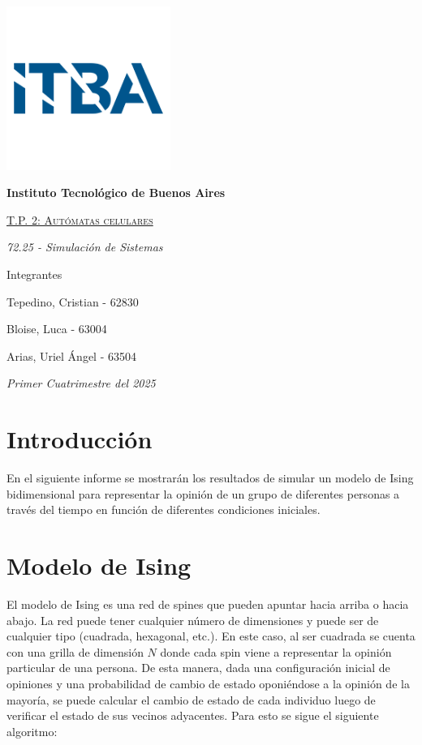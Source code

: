 \documentclass[12pt]{article}
\begin{document}
\begin{titlepage}
\begin{center}

{\includegraphics[width=0.4\textwidth]{itba-1.png}\par}
\vspace{1cm}
{\bfseries\LARGE Instituto Tecnológico de Buenos Aires \par}
\vspace{0.5cm}
{\scshape\Huge\underline {T.P. 2: Autómatas celulares} \par}
\vspace{0.4cm}
{\Large\itshape 72.25 - Simulación de Sistemas  \par}
\end{center}
\vfill

{\Large Integrantes \par}
\centering
{\Large Tepedino, Cristian - 62830 \par}
{\Large Bloise, Luca - 63004 \par}
{\Large Arias, Uriel Ángel - 63504 \par}

\vfill
{\Large\itshape Primer Cuatrimestre del 2025 \par}
\end{titlepage}

\setcounter{page}{0}
\tableofcontents
\clearpage

\section{Introducción}
En el siguiente informe se mostrarán los resultados de simular un modelo de Ising bidimensional para representar la opinión de un grupo de diferentes personas a través del tiempo en función de diferentes condiciones iniciales.

\section{Modelo de Ising}
El modelo de Ising es una red de spines que pueden apuntar hacia arriba o
hacia abajo. La red puede tener cualquier número de dimensiones y puede ser
de cualquier tipo (cuadrada, hexagonal, etc.). En este caso, al ser cuadrada se cuenta con una grilla de dimensión $N$ donde cada spin viene a representar la opinión particular de una persona. De esta manera, dada una configuración inicial de opiniones y una probabilidad de cambio de estado oponiéndose a la opinión de la mayoría, se puede calcular el cambio de estado de cada individuo luego de verificar el estado de sus vecinos adyacentes. Para esto se sigue el siguiente algoritmo:
\end{document}
